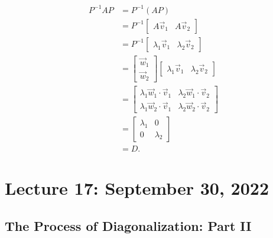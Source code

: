         \begin{align*}
            P^{-1}AP&=P^{-1}(AP) \\
            &=P^{-1}\begin{bmatrix} A\vec{v}_1 & A\vec{v}_2 \end{bmatrix} \\
            &=P^{-1}\begin{bmatrix} \lambda_1\vec{v}_1 & \lambda_2\vec{v}_2 \end{bmatrix} \\
            &=\begin{bmatrix} \vec{w}_1 \\ \vec{w}_2 \end{bmatrix}\begin{bmatrix} \lambda_1\vec{v}_1 & \lambda_2\vec{v}_2 \end{bmatrix} \\
            &=\begin{bmatrix} \lambda_1\vec{w}_1\cdot\vec{v}_1 & \lambda_2\vec{w}_1\cdot\vec{v}_2 \\ \lambda_1\vec{w}_2\cdot\vec{v}_1 & \lambda_2\vec{w}_2\cdot\vec{v}_2 \end{bmatrix} \\
            &=\begin{bmatrix} \lambda_1 & 0 \\ 0 & \lambda_2 \end{bmatrix} \\
            &=D.
        \end{align*}

\pagebreak

\section{Lecture 17: September 30, 2022}

    \subsection{The Process of Diagonalization: Part II}


